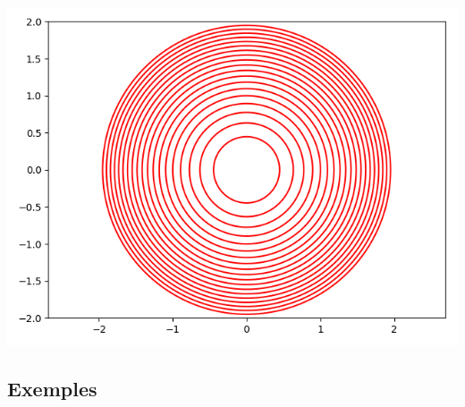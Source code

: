 \documentclass[11pt,class=report,crop=false]{standalone}
\begin{document}
\begin{exemple}
\begin{center}
\includegraphics[scale=\myscale,scale=0.5]{figures/fonctions-niveau-1d}
\end{center}


\end{exemple}


\subsection{Exemples}
\end{document}
